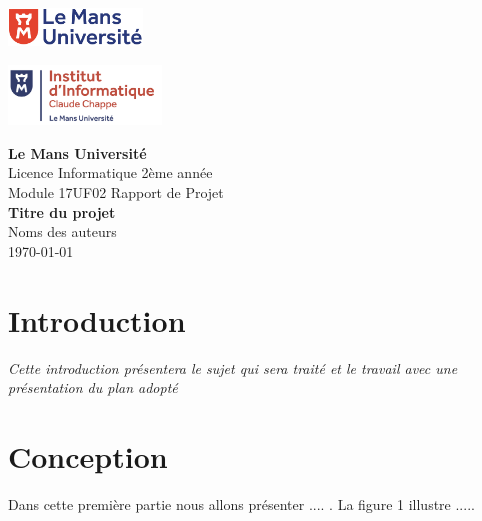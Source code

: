 \documentclass[12pt,a4paper, twoside]{article}
\begin{document}
\begin{titlepage}
    \begin{minipage}[t]{0.48\textwidth}
        \includegraphics[height=1.01cm]{logolemansU.png}
    \end{minipage}
    \hfill
    \begin{minipage}[t]{0.25\textwidth}
        \includegraphics[height=1.6cm]{logo_IC2.png}
    \end{minipage}
    
    \vspace{2cm}
    \begin{center}
        \Large\textbf{Le Mans Université}\\
        \vspace{0.5cm}
        Licence Informatique 2ème année\\
        Module 17UF02 Rapport de Projet\\
        \vspace{0.5cm}
        \Large\textbf{Titre du projet}\\
        \vspace{1cm}
        {\large Noms des auteurs}\\
        \vspace{0.5cm}
        {\normalsize \today} 
    \end{center}
\end{titlepage}

\newpage
\tableofcontents
\newpage
{}
\section{Introduction}

\emph{Cette introduction présentera le sujet qui sera traité et le travail avec une présentation du plan adopté} \\
    
\section{Conception}
    Dans cette première partie nous allons présenter .... . La figure 1 illustre .....
\end{document}
